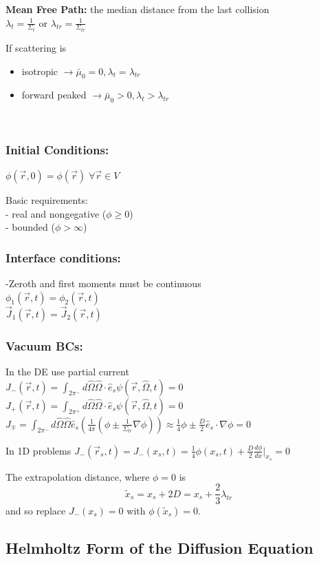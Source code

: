 \documentclass{report}
\newcommand{\tab}{\-\hspace{1cm}}
\newcommand{\hh}[1]{\subsection*{#1}}
\newcommand{\hhh}[1]{\subsubsection*{#1}}
\newcommand{\Xs}{\Sigma}
\newcommand{\pos}{\vec{r}}
\newcommand{\cur}{\vec{J}}
\newcommand{\Oh}{\hat{\Omega}}
\newcommand{\rt}{(\pos,t)}
\newcommand{\rOt}{(\pos,\Oh,t)}
\begin{document}
\textbf{Mean Free Path:} the median distance from the last collision\\
$\lambda_t = \frac{1}{\Xs_t}$ or $\lambda_{tr} = \frac{1}{\Xs_{tr}}$

If scattering is 
\begin{itemize}
    \item isotropic $\rightarrow \bar{\mu}_0 = 0, \lambda_t = \lambda_{tr}$
    \item forward peaked $\rightarrow \bar{\mu}_0 > 0, \lambda_t > \lambda_{tr}$
\end{itemize}
\-\\

\begin{multicols}{2}
\hhh{Initial Conditions:} 
$\phi(\pos,0) = \phi(\pos) \; \forall \pos \in V$

Basic requirements:\\
- real and nongegative ($\phi \geq 0$)\\
- bounded ($\phi > \infty$) \\

\hhh{Interface conditions:} 
-Zeroth and first moments must be continuous\\
\tab$\phi_1\rt = \phi_2\rt$\\
\tab$\cur_1\rt = \cur_2\rt$\\

\columnbreak
\hhh{Vacuum BCs:}
In the DE use partial current\\
\tab $J_{-}\rt = \int_{2\pi^{-}} d\Oh \Oh \cdot \hat{e}_s \psi\rOt = 0$\\
\tab $J_{+}\rt = \int_{2\pi^{+}} d\Oh \Oh \cdot \hat{e}_s \psi\rOt = 0$\\

$J_{\mp} = \int_{2\pi^{-}} d\Oh \Oh \hat{e}_s \left( \frac{1}{4\pi} \left( \phi \pm \frac{1}{\Xs_{tr}} \nabla \phi \right)\right) \approx \frac{1}{4}\phi \pm \frac{D}{2}\hat{e}_s \cdot \nabla \phi = 0$

In 1D problems
$J_{-}(\pos_s,t) = J_{-}(x_s,t) = \frac{1}{4}\phi(x_s,t) + \frac{D}{2}\frac{d\phi}{dx}|_{x_s} = 0$

The extrapolation distance, where $\phi = 0$ is
$$\tilde{x}_s = x_s + 2D = x_s + \frac{2}{3}\lambda_{tr}$$
and so replace $J_{-}(x_s) = 0$ with $ \phi(\tilde{x}_s) = 0$.
\end{multicols}


\hh{Helmholtz Form of the Diffusion Equation}
\end{document}

